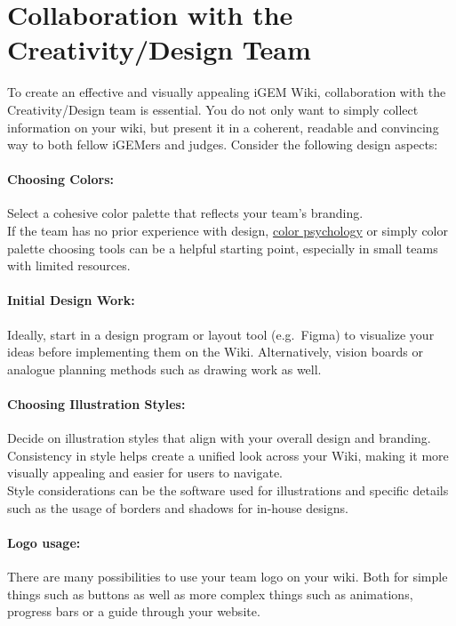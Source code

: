 \section{Collaboration with the Creativity/Design Team } \label{sec:2.1}
To create an effective and visually appealing iGEM Wiki, collaboration with the Creativity/Design team is essential.
You do not only want to simply collect information on your wiki, but present it in a coherent, readable and convincing way to both fellow iGEMers and judges.
Consider the following design aspects:

\paragraph{Choosing Colors:} Select a cohesive color palette that reflects your team’s branding.\\
If the team has no prior experience with design, \href{https://en.wikipedia.org/wiki/Color_psychology}{color psychology}\cite{colorpsychology} or simply color palette choosing tools can be a helpful starting point, especially in small teams with limited resources.
\paragraph{Initial Design Work:} Ideally, start in a design program or layout tool (e.g.\ Figma) to visualize your ideas before implementing them on the Wiki.
Alternatively, vision boards or analogue planning methods such as drawing work as well.
\paragraph{Choosing Illustration Styles:} Decide on illustration styles that align with your overall design and branding.
Consistency in style helps create a unified look across your Wiki, making it more visually appealing and easier for users to navigate. \\
Style considerations can be the software used for illustrations and specific details such as the usage of borders and shadows for in-house designs.
\paragraph{Logo usage:} There are many possibilities to use your team logo on your wiki.
Both for simple things such as buttons as well as more complex things such as animations, progress bars or a guide through your website.

